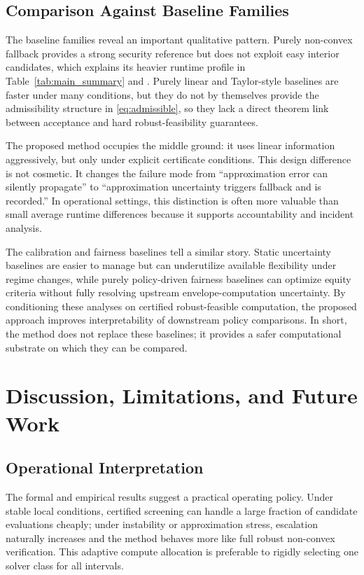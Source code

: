 \documentclass{article} %
\begin{document}
\subsection{Comparison Against Baseline Families}
The baseline families reveal an important qualitative pattern. Purely non-convex fallback provides a strong security reference but does not exploit easy interior candidates, which explains its heavier runtime profile in Table~\ref{tab:main_summary} and . Purely linear and Taylor-style baselines are faster under many conditions, but they do not by themselves provide the admissibility structure in \eqref{eq:admissible}, so they lack a direct theorem link between acceptance and hard robust-feasibility guarantees.

The proposed method occupies the middle ground: it uses linear information aggressively, but only under explicit certificate conditions. This design difference is not cosmetic. It changes the failure mode from ``approximation error can silently propagate'' to ``approximation uncertainty triggers fallback and is recorded.'' In operational settings, this distinction is often more valuable than small average runtime differences because it supports accountability and incident analysis.

The calibration and fairness baselines tell a similar story. Static uncertainty baselines are easier to manage but can underutilize available flexibility under regime changes, while purely policy-driven fairness baselines can optimize equity criteria without fully resolving upstream envelope-computation uncertainty. By conditioning these analyses on certified robust-feasible computation, the proposed approach improves interpretability of downstream policy comparisons. In short, the method does not replace these baselines; it provides a safer computational substrate on which they can be compared.

\section{Discussion, Limitations, and Future Work}
\subsection{Operational Interpretation}
The formal and empirical results suggest a practical operating policy. Under stable local conditions, certified screening can handle a large fraction of candidate evaluations cheaply; under instability or approximation stress, escalation naturally increases and the method behaves more like full robust non-convex verification. This adaptive compute allocation is preferable to rigidly selecting one solver class for all intervals.
\end{document}

